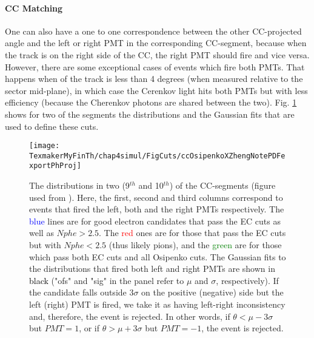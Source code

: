 \paragraph{CC \ph Matching}
One can also have a one to one correspondence between the other CC-projected angle \php and the left or right PMT in the corresponding CC-segment, because when the track is on the right side of the CC, the right PMT should fire and vice versa. However, there are some exceptional cases of events which fire both PMTs. That happens when \php of the track is less than 4 degrees (when measured relative to the sector mid-plane), in which case the Cerenkov light hits both PMTs but with less efficiency %
(because the Cherenkov photons are shared between the two). Fig. \ref{ccPhProjDist} shows for two of the segments the \php distributions and the Gaussian fits that are used to define these cuts.
\begin{figure}[H] %
\centering
\leavevmode \texttt{[image: TexmakerMyFinTh/chap4simul/FigCuts/ccOsipenkoXZhengNotePDFexportPhProj]}  %
\caption[CC-projected \ph distributions]{The \php distributions in two (9$^{th}$ and 10$^{th}$) of the CC-segments (figure used from \cite{anaNoteXZheng}). Here, the first, second and third columns correspond to events that fired the left, both and the right PMTs respectively. The \textcolor{blue}{blue} lines are for good electron candidates that pass the EC cuts as well as $Nphe > 2.5$. The \textcolor{red}{red} ones are for those that pass the EC cuts but with $Nphe < 2.5$ (thus likely pions), and the \textcolor{green}{green} are for those which pass both EC cuts and all Osipenko cuts. The Gaussian fits to the distributions that fired both left and right PMTs are shown in \textcolor{black}{black} ("ofs" and "sig" in the panel refer to $\mu$ and $\sigma$, respectively). If the candidate falls outside $3 \sigma$ on the positive (negative) side but the left (right) PMT is fired, we take it as having left-right inconsistency and, therefore, the event is rejected. In other words, if $\theta < \mu - 3 \sigma$ but $PMT=1$, or if $\theta > \mu + 3 \sigma$ but $PMT=-1$, the event is rejected.}
\label{ccPhProjDist}
\end{figure}

